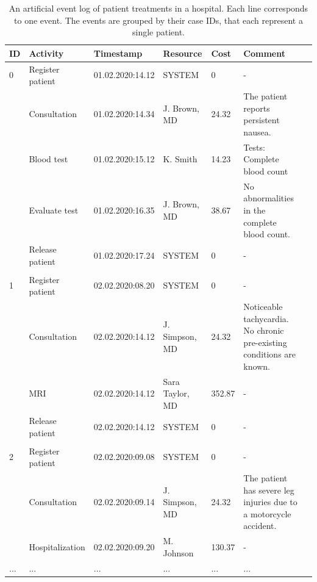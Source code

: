 \begin{table}[htbp!]
	\small
	\setlength\tabcolsep{3pt}
	\begin{tabularx}{\textwidth}{lllllp{4.7cm}l}
		\toprule
		\textbf{ID} & \textbf{Activity}          & \textbf{Timestamp} & \textbf{Resource} & \textbf{Cost} & \textbf{Comment}  \\
		\midrule
		0                & Register patient           & 01.02.2020:14.12   & SYSTEM            & 0             & -     \\
		& Consultation               & 01.02.2020:14.34   & J. Brown, MD    & 24.32         & The patient reports persistent nausea.   \\
		& Blood test                 & 01.02.2020:15.12   & K. Smith         & 14.23         & Tests: Complete blood count    \\
		& Evaluate test  & 01.02.2020:16.35   & J. Brown, MD    & 38.67         &No abnormalities in the complete blood count.   \\
		& Release patient            & 01.02.2020:17.24   & SYSTEM            & 0             & -  \\
		&                            &                    &                   &               &     \\
		\midrule
		1                & Register patient           & 02.02.2020:08.20   & SYSTEM            & 0             & -  \\
		& Consultation               & 02.02.2020:14.12   & J. Simpson, MD  & 24.32         & Noticeable tachycardia. No chronic pre-existing conditions are known.    \\
		& MRI & 02.02.2020:14.12   & Sara Taylor, MD   & 352.87        & -    \\
		& Release patient            & 02.02.2020:14.12   & SYSTEM            & 0             & -   \\
		&                            &                    &                   &               &     \\
		\midrule
		2                & Register patient           & 02.02.2020:09.08   & SYSTEM            & 0             & -    \\
		& Consultation               & 02.02.2020:09.14   & J. Simpson, MD  & 24.32         & The patient has severe leg injuries due to a motorcycle accident.  \\
		& Hospitalization       & 02.02.2020:09.20   & M. Johnson      & 130.37        & -     \\
		...              & ...                        & ...                & ...               & ...           & ...     \\ \bottomrule
	\end{tabularx}
	\caption[Artificial event log of patient treatments in a hospital]{An artificial event log of patient treatments in a hospital. Each line corresponds to one event. The events are grouped by their case IDs, that each represent a single patient.}
	\label{tab:event-log}
\end{table}

